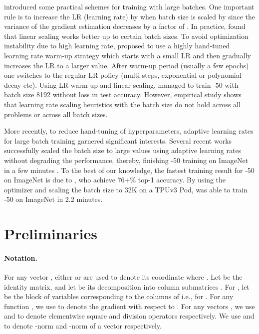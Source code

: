 \documentclass{article} \usepackage{iclr2020_conference,times}
\begin{document}
\citet{krizhevsky2014one} introduced some practical schemes for training with large batches. One important rule is to increase the LR (learning rate) by  when batch size is scaled by  since  the variance of the gradient estimation decreases by a factor of . In practice, \citep{krizhevsky2014one} found that  linear scaling works better up to certain batch sizes. To avoid optimization instability due to high learning rate, \citet{goyal2017accurate} proposed to use a highly hand-tuned  learning rate warm-up strategy which starts with a small LR and then gradually increases the LR to a larger value. After warm-up period (usually a few epochs) one switches to the regular LR policy (multi-steps, exponential or polynomial decay etc). Using LR warm-up and linear scaling, \citet{goyal2017accurate} managed to train -50 with batch size 8192 without loss in test accuracy. However, empirical study \citep{shallue2018measuring} shows that learning rate scaling heuristics with the batch size do not hold across all problems or across all batch sizes.

More recently, to reduce hand-tuning of hyperparameters, adaptive learning rates for large batch training garnered significant interests. Several recent works successfully scaled the batch size to large values using adaptive learning rates without degrading the performance, thereby, finishing -50 training on ImageNet in a few minutes \citep{you2018imagenet,iandola2016firecaffe,codreanu2017scale,akiba2017extremely,jia2018highly,smith2017don,martens2015optimizing,devarakonda2017adabatch,mikami2018imagenet,osawa2018second,you2019large,yamazaki2019yet}.
To the best of our knowledge, the fastest training result for -50 on ImageNet is due to \cite{ying2018image}, who achieve 76+\% top-1 accuracy. By using the  optimizer and scaling the batch size to 32K  on a TPUv3 Pod, \citet{ying2018image} was able to train -50 on ImageNet in 2.2 minutes. 

\fi 
\section{Preliminaries}


\paragraph{Notation.}  
For any vector , either  or  are used to denote its  coordinate where .  Let  be the  identity matrix, and let  be its decomposition into column submatrices . For , let  be the block of variables corresponding to the columns of  i.e.,   for
. For any function , we use  to denote the gradient with respect to . For any vectors , we use  and  to denote elementwise square and division operators respectively.
We use  and  to denote -norm and -norm of a vector respectively.
\end{document}
